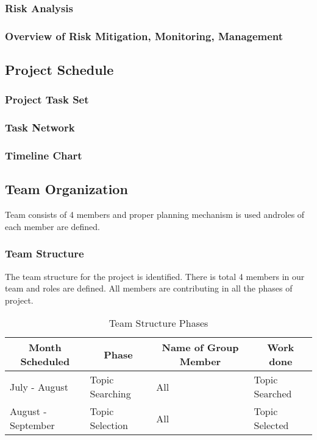 \documentclass[a4paper, oneside, 12pt]{book}
\begin{document}
			\subsubsection{Risk Analysis}
			\subsubsection{Overview of Risk Mitigation, Monitoring, Management}
		\subsection{Project Schedule}
			\subsubsection{Project Task Set}
			\subsubsection{Task Network}
			\subsubsection{Timeline Chart}
		\subsection{Team Organization}
			Team consists of 4 members and proper planning mechanism is used androles of each member are defined.
			\subsubsection{Team Structure}
				The team structure for the project is identified. There is total 4 members in our team and roles are defined. All members are contributing in all the phases of project.
				\begin{table}[H]
					\begin{tabular}{|l|l|l|l|}
						\hline
						\multicolumn{1}{|c|}{\textbf{Month Scheduled}} & \multicolumn{1}{c|}{\textbf{Phase}} & \multicolumn{1}{c|}{\textbf{Name of Group Member}} & \multicolumn{1}{c|}{\textbf{Work done}} \\ \hline
						July - August                                  & Topic Searching                     & All                                                & Topic Searched                          \\ \hline
						August - September                             & Topic Selection                     & All                                                & Topic Selected                          \\ \hline
					\end{tabular}
					\caption{Team Structure Phases}
					\label{tab:team-structure-phases}
				\end{table}
\end{document}
